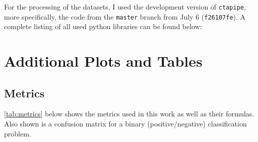 For the processing of the datasets, I used the development version of \texttt{ctapipe}, more specifically,
the code from the \texttt{master} branch from July 6 (\texttt{f26107fe}). A complete listing of all used python libraries can be found below:
\begin{spacing}{0.5}
    \begin{mdframed}[backgroundcolor=codebg, hidealllines=true, leftmargin=0cm,rightmargin=0cm, skipabove=0pt, innerleftmargin=0,innerrightmargin=0,]
    
    \end{mdframed}
\end{spacing}


\section{Additional Plots and Tables}
\label{ap:additional_plots_tables}

\subsection{Metrics}
\label{ap:metrics}
\autoref{tab:metrics} below shows the metrics used in this work as well as their formulas. Also shown is a confusion matrix for
a binary (positive/negative) classification problem.

